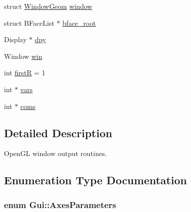 \begin{CompactItemize}
\item 
struct \hyperlink{structGui_1_1WindowGeom}{WindowGeom} \hyperlink{namespaceGui_32823865b86d01eb5cc0797ef95b72d1}{window}
\item 
struct BFaceList $\ast$ \hyperlink{namespaceGui_f84d6dd43874bce8629a513c3cbaff73}{bface\_\-root}
\item 
Display $\ast$ \hyperlink{namespaceGui_7cffe1d85006be54ecc4edc51a9978be}{dpy}
\item 
Window \hyperlink{namespaceGui_ca6acfc184422daa4fa15bd0c6ce422b}{win}
\item 
int \hyperlink{namespaceGui_e1e212e4a0c46b3ff775b1aa017e7bfc}{firstR} = 1
\item 
int $\ast$ \hyperlink{namespaceGui_6f927abe8b3833f6de26cd97440c1598}{vars}
\item 
int $\ast$ \hyperlink{namespaceGui_a46e6ad4b192cdaba9efb1ada2133df9}{coms}
\end{CompactItemize}


\subsection{Detailed Description}
OpenGL window output routines. 



\subsection{Enumeration Type Documentation}
\hypertarget{namespaceGui_a8302259e8c5ddb260972b85a19f6b0f}{
\subsubsection[{AxesParameters}]{\setlength{\rightskip}{0pt plus 5cm}enum {\bf Gui::AxesParameters}}}
\label{namespaceGui_a8302259e8c5ddb260972b85a19f6b0f}


